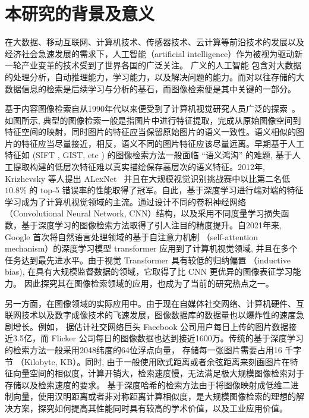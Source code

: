 \section{本研究的背景及意义}
在大数据、移动互联网、计算机技术、传感器技术、云计算等前沿技术的发展以及经济社会急速发展的需求下，人工智能（artificial intelligence）作为被视为驱动新一轮产业变革的技术受到了世界各国的广泛关注。 广义的人工智能\cite{russell2010artificial} 包含对大数据的处理分析，自动推理能力，学习能力，以及解决问题的能力。而对以往存储的大数据信息的检索是后续学习与分析的基石，而图像检索便是其中关键的一部分。 \par
基于内容图像检索自从1990年代以来便受到了计算机视觉研究人员广泛的探索~\cite{zhou2017recent}。如图所示, 典型的图像检索一般是指图片中进行特征提取，完成从原始图像空间到特征空间的映射，同时图片的特征应当保留原始图片的语义一致性。语义相似的图片的特征应当尽量接近，相反，语义不同的图片特征应该尽量远离。早期基于人工特征如 (SIFT , GIST, etc ) 的图像检索方法一般面临 ``语义鸿沟'' \cite{li2016socializing} 的难题, 基于人工提取构建的低层次特征难以真实描绘保存高层次的语义特征。2012年, Krizhevsky 等人提出 ALexNet~\cite{krizhevsky2017imagenet} 并且在大规模视觉识别挑战赛中以比第二名低 $10.8\%$ 的 top-5 错误率的性能取得了冠军。自此，基于深度学习进行端对端的特征学习成为了计算机视觉领域的主流。通过设计不同的卷积神经网络（Convolutional Neural Network, CNN）结构，以及采用不同度量学习损失函数，基于深度学习的图像检索方法取得了引人注目的精度提升。自2021年来, Google 首次将自然语言处理领域的基于自注意力机制 （self-attention mechanism）的深度学习模型 transformer 应用到了计算机视觉领域, 并且在多个任务达到最先进水平。由于视觉 Transformer 具有较低的归纳偏置 （inductive bias), 在具有大规模监督数据的领域，它取得了比 CNN 更优异的图像表征学习能力。 因此探究其在图像检索领域的应用，也成为了当前的研究热点之一。  \par
另一方面，在图像领域的实际应用中。由于现在自媒体社交网络、计算机硬件、互联网技术以及数字成像技术的飞速发展，图像数据库的数据量也以爆炸性的速度急剧增长。例如， 据估计社交网络巨头 Facebook 公司用户每日上传的图片数据接近3.5亿，而 Flicker 公司每日的图像数据也达到接近1600万。传统的基于深度学习的检索方法一般采用2048纬度的64位浮点向量， 存储每一张图片需要占用16 千字节 （Kilobyte, KB）。同时, 由于一般使用欧式距离或者余弦距离来刻画图片在特征向量空间的相似度，计算开销大，检索速度慢，无法满足极大规模图像检索对于存储以及检索速度的要求。 基于深度哈希的检索方法由于将图像映射成低维二进制向量，使用汉明距离或者非对称距离计算相似度，是大规模图像检索的理想的解决方案，探究如何提高其性能同时具有较高的学术价值，以及工业应用价值。\par
